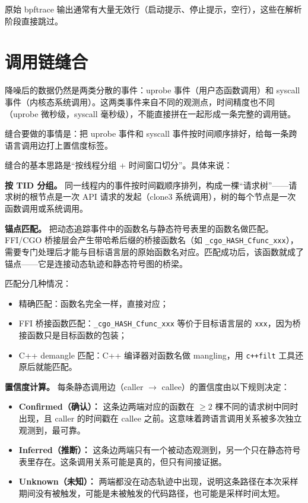 原始 bpftrace 输出通常有大量无效行（启动提示、停止提示，空行），这些在解析阶段直接跳过。

\section{调用链缝合}

降噪后的数据仍然是两类分散的事件：uprobe 事件（用户态函数调用）和 syscall 事件（内核态系统调用）。这两类事件来自不同的观测点，时间精度也不同（uprobe 微秒级，syscall 毫秒级），不能直接拼在一起形成一条完整的调用链。

缝合要做的事情是：把 uprobe 事件和 syscall 事件按时间顺序排好，给每一条跨语言调用边打上置信度标签。

缝合的基本思路是“按线程分组 + 时间窗口切分”。具体来说：

\textbf{按 TID 分组。} 同一线程内的事件按时间戳顺序排列，构成一棵“请求树”——请求树的根节点是一次 API 请求的发起（clone3 系统调用），树的每个节点是一次函数调用或系统调用。

\textbf{锚点匹配。} 把动态追踪事件中的函数名与静态符号表里的函数名做匹配。FFI/CGO 桥接层会产生带哈希后缀的桥接函数名（如 \texttt{\_cgo\_HASH\_Cfunc\_xxx}），需要专门处理后才能与目标语言层的原始函数名对应。匹配成功后，该函数就成了\textquotedbl 锚点\textquotedbl ——它是连接动态轨迹和静态符号图的桥梁。

匹配分几种情况：
\begin{itemize}
    \item 精确匹配：函数名完全一样，直接对应；
    \item FFI 桥接函数匹配：\texttt{\_cgo\_HASH\_Cfunc\_xxx} 等价于目标语言层的 \texttt{xxx}，因为桥接函数只是目标函数的包装；
    \item C++ demangle 匹配：C++ 编译器对函数名做 mangling，用 \texttt{c++filt} 工具还原后就能匹配。
\end{itemize}

\textbf{置信度计算。} 每条静态调用边（caller $\rightarrow$ callee）的置信度由以下规则决定：

\begin{itemize}
    \item \textbf{Confirmed（确认）：} 这条边两端对应的函数在 $\ge 2$ 棵不同的请求树中同时出现，且 caller 的时间戳在 callee 之前。这意味着跨语言调用关系被多次独立观测到，最可靠。
    \item \textbf{Inferred（推断）：} 这条边两端只有一个被动态观测到，另一个只在静态符号表里存在。这条调用关系可能是真的，但只有间接证据。
    \item \textbf{Unknown（未知）：} 两端都没在动态轨迹中出现，说明这条路径在本次采样期间没有被触发，可能是未被触发的代码路径，也可能是采样时间太短。
\end{itemize}

